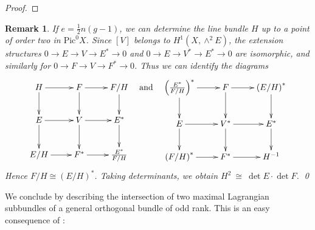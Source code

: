 \documentclass[10pt]{amsart}
\numberwithin{equation}{section}
\newcommand{\Ker}{\mathrm{Ker}}
\newcommand{\Sec}{\mathrm{Sec}}
\newcommand{\Pic}{\mathrm{Pic}}
\newcommand{\Gr}{\mathrm{Gr}}
\newtheorem{rmk}[theorem]{{\textbf Remark}}
\newenvironment{remark}{\begin{rmk}\rm}{\end{rmk}}
\begin{document}
\begin{proof}
\end{proof}

\begin{remark} If $e = \frac{1}{2}n(g-1)$, we can determine the line bundle $H$ up to a point of order two in $\Pic^0 X$. Since $[V]$ belongs to $H^1(X, \wedge^2 E)$, the extension structures $0 \to E \to V \to E^* \to 0$ and $0 \to E \to V^* \to E^* \to 0$ are isomorphic, and similarly for $0 \to F \to V \to F^* \to 0$. Thus we can identify the diagrams
\[ \xymatrix{ H \ar[r] \ar[d] & F \ar[r] \ar[d] & F/H \ar[d] \\
 E \ar[r] \ar[d] & V \ar[r] \ar[d] & E^* \ar[d] \\
 E/H \ar[r] & F^* \ar[r] & \frac{E^*}{F/H} } \quad \hbox{and} \quad \xymatrix{ \left( \frac{E^*}{F/H} \right)^* \ar[r] \ar[d] & F \ar[r] \ar[d] & \left( E/H \right)^* \ar[d] \\
 E \ar[r] \ar[d] & V^* \ar[r] \ar[d] & E^* \ar[d] \\
 \left( F/H \right)^* \ar[r] & F^* \ar[r] & H^{-1} } \]
Hence $F/H \cong (E/H)^*$. Taking determinants, we obtain $H^2 \ \cong \ \det E \cdot \det F$. \qed
\end{remark}

We conclude by describing the intersection of two maximal Lagrangian subbundles of a general orthogonal bundle of odd rank. This is an easy consequence of \cite[Proposition 5.5]{CH4}:
\end{document}
